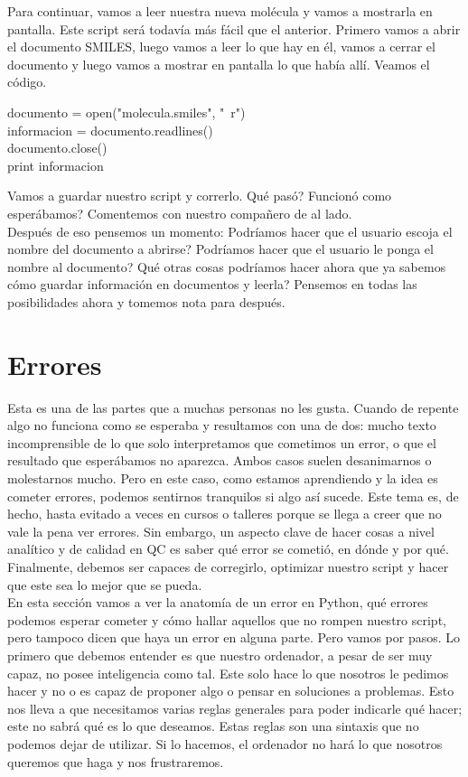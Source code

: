 \documentclass[10pt,letterpaper]{article}
\newenvironment{Code}
{
\begin{lrbox}{\selvestebox}%
\begin{minipage}{\dimexpr\columnwidth-2\fboxsep\relax}
\fontfamily{\ttdefault}\selectfont
}
{\end{minipage}\end{lrbox}%
\begin{center}
\colorbox{light-gray}{\usebox{\selvestebox}}
\end{center}
}
\begin{document}
Para continuar, vamos a leer nuestra nueva mol\'ecula y vamos a mostrarla en pantalla. Este script ser\'a todav\'ia m\'as f\'acil que el anterior. Primero vamos a abrir el documento SMILES, luego vamos a leer lo que hay en \'el, vamos a cerrar el documento y luego vamos a mostrar en pantalla lo que hab\'ia all\'i. Veamos el c\'odigo.

\begin{Code}
documento = open("molecula.smiles", "\ \hspace{-2mm}r")\\
informacion = documento.readlines()\\
documento.close()\\
print informacion
\end{Code}

Vamos a guardar nuestro script y correrlo. Qu\'e pas\'o? Funcion\'o como esper\'abamos? Comentemos con nuestro compa\~nero de al lado.\\

Despu\'es de eso pensemos un momento: Podr\'iamos hacer que el usuario escoja el nombre del documento a abrirse? Podr\'iamos hacer que el usuario le ponga el nombre al documento? Qu\'e otras cosas podr\'iamos hacer ahora que ya sabemos c\'omo guardar informaci\'on en documentos y leerla? Pensemos en todas las posibilidades ahora y tomemos nota para despu\'es.

\section{Errores}
Esta es una de las partes que a muchas personas no les gusta. Cuando de repente algo no funciona como se esperaba y resultamos con una de dos: mucho texto incomprensible de lo que solo interpretamos que cometimos un error, o que el resultado que esper\'abamos no aparezca. Ambos casos suelen desanimarnos o molestarnos mucho. Pero en este caso, como estamos aprendiendo y la idea es cometer errores, podemos sentirnos tranquilos si algo as\'i sucede. Este tema es, de hecho, hasta evitado a veces en cursos o talleres porque se llega a creer que no vale la pena ver errores. Sin embargo, un aspecto clave de hacer cosas a nivel anal\'itico y de calidad en QC es saber qu\'e error se cometi\'o, en d\'onde y por qu\'e. Finalmente, debemos ser capaces de corregirlo, optimizar nuestro script y hacer que este sea lo mejor que se pueda.\\

En esta secci\'on vamos a ver la anatom\'ia de un error en Python, qu\'e errores podemos esperar cometer y c\'omo hallar aquellos que no rompen nuestro script, pero tampoco dicen que haya un error en alguna parte. Pero vamos por pasos. Lo primero que debemos entender es que nuestro ordenador, a pesar de ser muy capaz, no posee inteligencia como tal. Este solo hace lo que nosotros le pedimos hacer y no o es capaz de proponer algo o pensar en soluciones a problemas. Esto nos lleva a que necesitamos varias reglas generales para poder indicarle qu\'e hacer; este no sabr\'a qu\'e es lo que deseamos. Estas reglas son una sintaxis que no podemos dejar de utilizar. Si lo hacemos, el ordenador no har\'a lo que nosotros queremos que haga y nos frustraremos.\\
\end{document}
